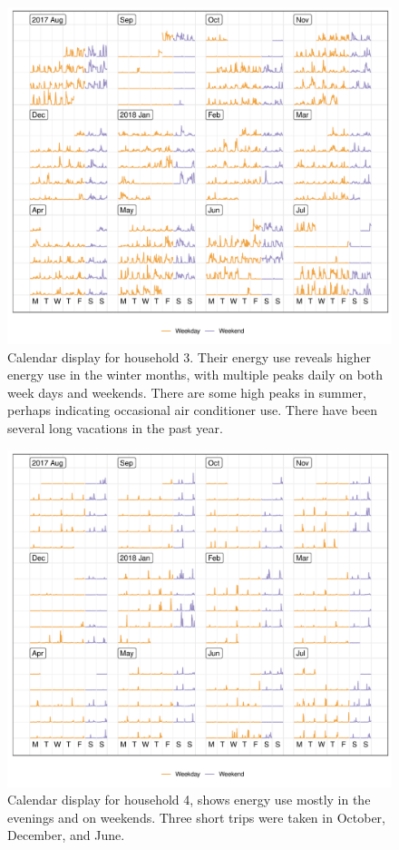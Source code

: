 \documentclass[12pt]{article}
\begin{document}
\begin{figure}

{\centering \includegraphics[width=\textwidth]{figure/h3-1} 

}

\caption{Calendar display for household 3. Their energy use reveals higher energy use in the winter months, with multiple peaks daily on both week days and weekends. There are some high peaks in summer, perhaps indicating occasional air conditioner use. There have been several long vacations in the past year.}\label{fig:h3}
\end{figure}

\begin{figure}

{\centering \includegraphics[width=\textwidth]{figure/h4-1} 

}

\caption{Calendar display for household 4, shows energy use mostly in the evenings and on weekends. Three short trips were taken in October, December, and June.}\label{fig:h4}
\end{figure}
\end{document}

